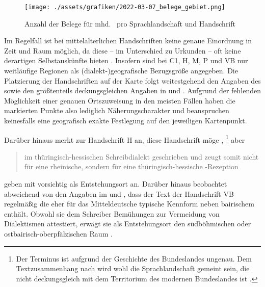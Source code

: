 \begin{figure}
\centering
\texttt{[image: ./assets/grafiken/2022-03-07\_belege\_gebiet.png]}
\caption[Anzahl der Belege für mhd.\  pro Sprachlandschaft und
Handschrift]{Anzahl der Belege für mhd.\  pro Sprachlandschaft
und Handschrift\nocite{wiesinger1983:rede}}
\label{fig:kartebelegzahl}
\end{figure}

Im Regelfall ist bei mittelalterlichen Handschriften keine genaue Einordnung in
Zeit und Raum möglich, da diese -- im Unterschied zu Urkunden -- oft keine
derartigen Selbstauskünfte bieten
\autocites[1309--1310]{wegera2000}[117--121]{bein2011}. Insofern sind bei
C1, H, M, P und VB nur
weitläufige Regionen als (dialekt-)geografische Bezugsgröße angegeben.%
Die Platzierung der Handschriften auf der Karte folgt weitestgehend den Angaben
des  \nosh\autocite{hsc} sowie den größtenteils deckungsgleichen
Angaben in \citet{kcdigital} und \citet{wolf:kckat}. Aufgrund der fehlenden
Möglichkeit einer genauen Ortszuweisung in den meisten Fällen haben die
markierten Punkte also lediglich Näherungscharakter und beanspruchen
keinesfalls eine geografisch exakte Festlegung auf den jeweiligen Kartenpunkt.

Darüber hinaus merkt \citet{klein1988} zur Handschrift H an, diese
Handschrift möge ,%
%
	\footnote{Der Terminus  ist aufgrund der Geschichte des
	Bundeslandes ungenau. Dem Textzusammenhang nach wird wohl die
	Sprachlandschaft gemeint sein, die nicht deckungsgleich mit dem Territorium
	des modernen Bundeslandes ist \autocite[vgl.~z.\,B.][853]{wiesinger1983}.}
%
aber \blockcquote[118]{klein1988}{im thüringisch-hessischen Schreibdialekt
geschrieben und zeugt somit nicht für eine rheinische, sondern für eine
thüringisch-hessische \nocite{schroeder1895}-Rezeption}.
\textcites{kcdigital}[23]{wolf:kckat} geben mit
\citet[237--238]{millerzimmermann2007} vorsichtig  als
Entstehungsort an.
%
\label{phsec:vbherkunft}%
Darüber hinaus beobachtet \citeauthor{schneider1987} abweichend von den
Angaben im  und \citet{kcdigital}, dass der Text der Handschrift
VB regelmäßig die eher für das Mitteldeutsche typische Kennform
  neben bairischem  enthält. Obwohl sie dem
Schreiber Bemühungen zur Vermeidung von Dialektismen attestiert, erwägt sie als
Entstehungsort den südböhmischen oder ostbairisch-oberpfälzischen Raum
\autocite[226]{schneider1987}.

